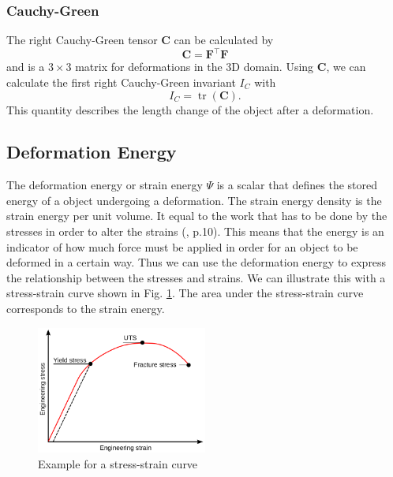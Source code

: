 \subsubsection{Cauchy-Green}
The right Cauchy-Green tensor \textbf{C} can be calculated by 
\begin{equation}\label{CG_DG}
	\mathbf{C} = \mathbf{F^\intercal F}
\end{equation}
and is a $3 \times 3$ matrix for deformations in the 3D domain. Using \textbf{C}, we can calculate the first right Cauchy-Green invariant $I_C$ with
\begin{equation} \label{tr_CG_DG}
	I_C = \operatorname{tr}(\mathbf{C}).
\end{equation}
This quantity describes the length change of the object after a deformation.

\subsection{Deformation Energy}
The deformation energy or strain energy $\Psi$ is a scalar that defines the stored energy of a object undergoing a deformation. The strain energy density is the strain energy per unit volume. It equal to the work that has to be done by the stresses in order to alter the strains (\cite{KORSUNSKY20175}, p.10). This means that the energy is an indicator of how much force must be applied in order for an object to be deformed in a certain way. Thus we can use the deformation energy to express the relationship between the stresses and strains. We can illustrate this with a stress-strain curve shown in Fig. \ref{fig:stress_strain}. The area under the stress-strain curve corresponds to the strain energy. 
\begin{figure}[!htbp]
	\centering
	\includegraphics[width=0.5\textwidth]{resources/stress_strain_curve.png}
	\caption[Stress-strain curve]{Example for a stress-strain curve\footnotemark}
	\label{fig:stress_strain}
\end{figure}

